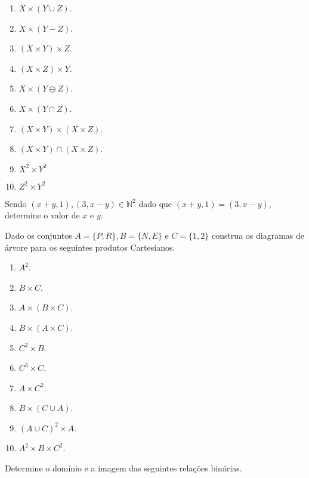 \begin{enumerate}
	\item $X  \times (Y \cup Z)$.
	\item $X  \times (Y - Z)$.
	\item $(X \times Y) \times Z$.
	\item $(X \times Z) \times Y$.
	\item $X  \times (Y \ominus Z)$.
	\item $X  \times (Y \cap Z)$.
	\item $(X \times Y) \times (X \times Z)$.
	\item $(X \times Y) \cap (X \times Z)$.
	\item $X^2 \times Y^2$
	\item $Z^2 \times Y^2$
\end{enumerate}

\begin{exercise}\label{exerc:Relcacoes3}
	Sendo $(x + y, 1), (3, x - y) \in \mathbb{N}^2$ dado que $(x + y, 1) = (3, x - y)$, determine o valor de $x$ e $y$.
\end{exercise}

\begin{exercise}\label{exerc:Relcacoes4}
	Dado os conjuntos $A = \{P, R\}, B = \{N, E\}$ e $C = \{1, 2\}$ construa os diagramas de árvore para os seguintes produtos Cartesianos.
\end{exercise}

\begin{enumerate}
	\item $A^2$.
	\item $B \times C$.
	\item $A \times (B \times C)$.
	\item $B \times (A \times C)$.
	\item $C^2 \times B$.
	\item $C^3 \times C$.
	\item $A \times C^2$.
	\item $B \times (C \cup A)$.
	\item $(A \cup C)^2 \times A$.
	\item $A^2 \times B \times C^2$.
\end{enumerate}

\begin{exercise}\label{exerc:Relcacoes5}
	Determine o domínio e a imagem das seguintes relações binárias.
\end{exercise}

